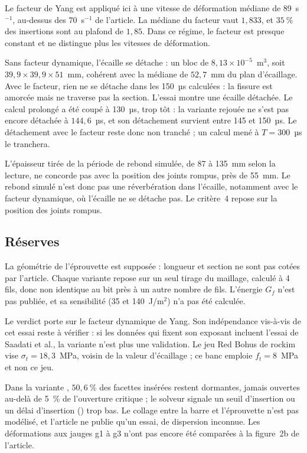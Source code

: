 Le facteur de Yang est appliqué ici à une vitesse de déformation médiane de 89~s$^{-1}$, au-dessus des 70~s$^{-1}$ de l'article. La médiane du facteur vaut $1{,}833$, et $35~\%$ des insertions sont au plafond de $1{,}85$. Dans ce régime, le facteur est presque constant et ne distingue plus les vitesses de déformation.

Sans facteur dynamique, l'écaille se détache : un bloc de $8{,}13\times10^{-5}$~m$^3$, soit $39{,}9 \times 39{,}9 \times 51$~mm, cohérent avec la médiane de $52{,}7$~mm du plan d'écaillage. Avec le facteur, rien ne se détache dans les 150~µs calculées : la fissure est amorcée mais ne traverse pas la section. L'essai montre une écaille détachée. Le calcul  prolongé a été coupé à 130~µs, trop tôt : la variante  rejouée ne s'est pas encore détachée à $144{,}6$~µs, et son détachement survient entre 145 et 150~µs. Le détachement avec le facteur reste donc non tranché ; un calcul mené à $T = 300$~µs le tranchera.

L'épaisseur tirée de la période de rebond simulée, de 87 à 135~mm selon la lecture, ne concorde pas avec la position des joints rompus, près de 55~mm. Le rebond simulé n'est donc pas une réverbération dans l'écaille, notamment avec le facteur dynamique, où l'écaille ne se détache pas. Le critère~4 repose sur la position des joints rompus.

\subsection{Réserves}

La géométrie de l'éprouvette est supposée : longueur et section ne sont pas cotées par l'article. Chaque variante repose sur un seul tirage du maillage, calculé à 4 fils, donc non identique au bit près à un autre nombre de fils. L'énergie $G_f$ n'est pas publiée, et sa sensibilité (35 et 140~J/m$^2$) n'a pas été calculée.

Le verdict porte sur le facteur dynamique de Yang. Son indépendance vis-à-vis de cet essai reste à vérifier : si les données qui fixent son exposant incluent l'essai de Saadati et al., la variante  n'est plus une validation. Le jeu Red Bohus de rockim vise $\sigma_t = 18{,}3$~MPa, voisin de la valeur d'écaillage ; ce banc emploie $f_t = 8$~MPa et non ce jeu.

Dans la variante , $50{,}6~\%$ des facettes insérées restent dormantes, jamais ouvertes au-delà de 5~\% de l'ouverture critique ; le solveur signale un seuil d'insertion ou un délai d'insertion () trop bas. Le collage entre la barre et l'éprouvette n'est pas modélisé, et l'article ne publie qu'un essai, de dispersion inconnue. Les déformations aux jauges g1 à g3 n'ont pas encore été comparées à la figure~2b de l'article.
